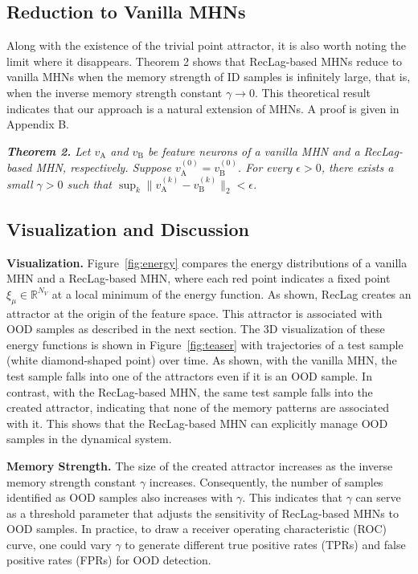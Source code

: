 \subsection{Reduction to Vanilla MHNs}
Along with the existence of the trivial point attractor, it is also worth noting the limit where it disappears.
Theorem 2 shows that RecLag-based MHNs reduce to vanilla MHNs when the memory strength of ID samples is infinitely large, that is, when the inverse memory strength constant $\gamma \to 0$.
This theoretical result indicates that our approach is a natural extension of MHNs.
A proof is given in Appendix B.

\vspace{5pt}
\noindent \textit{\textbf{Theorem 2.}
Let $v_{\mathrm{A}}$ and $v_{\mathrm{B}}$ be feature neurons of a vanilla MHN and a RecLag-based MHN, respectively. Suppose $v_{\mathrm{A}}^{(0)} = v_{\mathrm{B}}^{(0)}$. For every $\epsilon > 0$,
there exists a small $\gamma > 0$ such that $\sup_{k} \|v_{\mathrm{A}}^{(k)} - v_{\mathrm{B}}^{(k)}\|_{2} < \epsilon$.
}

\subsection{Visualization and Discussion}
\noindent \textbf{Visualization.}
Figure~\ref{fig:energy} compares the energy distributions of a vanilla MHN and a RecLag-based MHN, where each red point indicates a fixed point $\xi_{\mu} \in \mathbb{R}^{N_{V}}$ at a local minimum of the energy function.
As shown, RecLag creates an attractor at the origin of the feature space. This attractor is associated with OOD samples as described in the next section.
The 3D visualization of these energy functions is shown in Figure~\ref{fig:teaser} with trajectories of a test sample (white diamond-shaped point) over time.
As shown, with the vanilla MHN, the test sample falls into one of the attractors even if it is an OOD sample. %
In contrast, with the RecLag-based MHN, the same test sample falls into the created attractor, indicating that none of the memory patterns are associated with it. This shows that the RecLag-based MHN can explicitly manage OOD samples in the dynamical system.

\noindent \textbf{Memory Strength.}
The size of the created attractor increases as the inverse memory strength constant $\gamma$ increases. Consequently, the number of samples identified as OOD samples also increases with $\gamma$.
This indicates that $\gamma$ can serve as a threshold parameter that adjusts the sensitivity of RecLag-based MHNs to OOD samples.
In practice, to draw a receiver operating characteristic (ROC) curve, one could vary $\gamma$ to generate different true positive rates (TPRs) and false positive rates (FPRs) for OOD detection.

